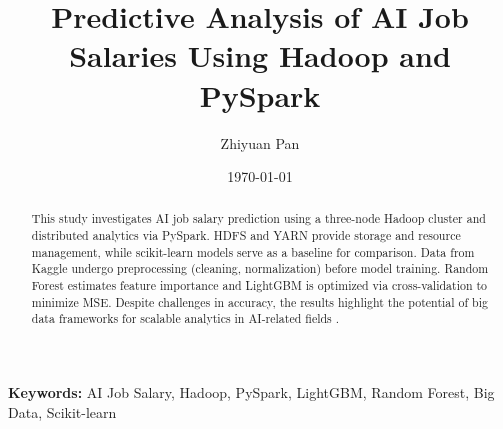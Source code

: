 \documentclass[12pt,a4paper]{article}
\title{Predictive Analysis of AI Job Salaries Using Hadoop and PySpark}
\author{Zhiyuan Pan}
\date{\today}
\begin{document}
\maketitle

\begin{abstract}
    This study investigates AI job salary prediction using a three-node Hadoop cluster and distributed analytics via PySpark. HDFS and YARN provide storage and resource management, while scikit-learn models serve as a baseline for comparison. Data from Kaggle undergo preprocessing (cleaning, normalization) before model training. Random Forest estimates feature importance and LightGBM is optimized via cross-validation to minimize MSE. Despite challenges in accuracy, the results highlight the potential of big data frameworks for scalable analytics in AI-related fields \cite{linkedin2023future}.
\end{abstract}
    
\textbf{Keywords:} AI Job Salary, Hadoop, PySpark, LightGBM, Random Forest, Big Data, Scikit-learn
    
\end{document}
